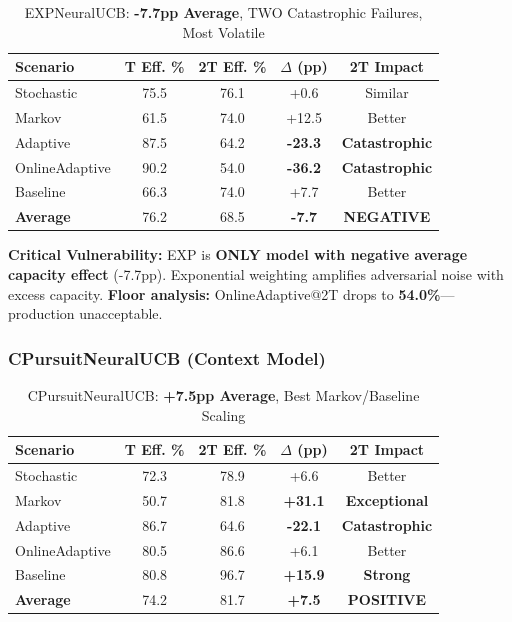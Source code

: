 \documentclass[11pt,a4paper]{article}
\newcommand{\critical}[1]{\textcolor{criticalcolor}{\textbf{#1}}}
\newcommand{\success}[1]{\textcolor{successcolor}{\textbf{#1}}}
\begin{document}
\vspace{-0.4cm}
\begin{table}[H]
\scriptsize
\centering
\begin{tabular}{lcccc}
\toprule
\textbf{Scenario} & \textbf{T Eff. \%} & \textbf{2T Eff. \%} & \textbf{$\Delta$ (pp)} & \textbf{2T Impact} \\
\midrule
Stochastic & 75.5 & 76.1 & +0.6 & Similar \\
Markov & 61.5 & 74.0 & +12.5 & Better \\
Adaptive & 87.5 & 64.2 & \critical{-23.3} & \critical{Catastrophic} \\
OnlineAdaptive & 90.2 & 54.0 & \critical{-36.2} & \critical{Catastrophic} \\
Baseline & 66.3 & 74.0 & +7.7 & Better \\
\midrule
\textbf{Average} & 76.2 & 68.5 & \critical{-7.7} & \critical{NEGATIVE} \\
\bottomrule
\end{tabular}
\vspace{-0.2cm}
\caption{EXPNeuralUCB: \critical{-7.7pp Average}, TWO Catastrophic Failures, Most Volatile}
\end{table}

\vspace{-0.2cm}
\textbf{Critical Vulnerability:} EXP is \critical{ONLY model with negative average capacity effect} (-7.7pp). Exponential weighting amplifies adversarial noise with excess capacity. \textbf{Floor analysis:} OnlineAdaptive@2T drops to \critical{54.0\%}—production unacceptable.

\subsubsection{CPursuitNeuralUCB (Context Model)}

\vspace{-0.4cm}
\begin{table}[H]
\scriptsize
\centering
\begin{tabular}{lcccc}
\toprule
\textbf{Scenario} & \textbf{T Eff. \%} & \textbf{2T Eff. \%} & \textbf{$\Delta$ (pp)} & \textbf{2T Impact} \\
\midrule
Stochastic & 72.3 & 78.9 & +6.6 & Better \\
Markov & 50.7 & 81.8 & \success{+31.1} & \success{Exceptional} \\
Adaptive & 86.7 & 64.6 & \critical{-22.1} & \critical{Catastrophic} \\
OnlineAdaptive & 80.5 & 86.6 & +6.1 & Better \\
Baseline & 80.8 & 96.7 & \success{+15.9} & \success{Strong} \\
\midrule
\textbf{Average} & 74.2 & 81.7 & \success{+7.5} & \success{POSITIVE} \\
\bottomrule
\end{tabular}
\vspace{-0.2cm}
\caption{CPursuitNeuralUCB: \success{+7.5pp Average}, Best Markov/Baseline Scaling}
\end{table}
\end{document}

